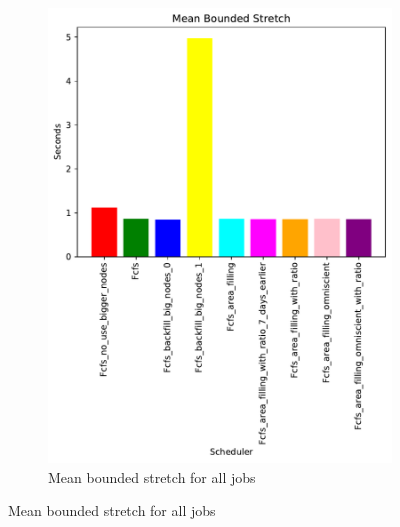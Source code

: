 \documentclass[a4paper]{article}
\begin{document}
\begin{figure}[H]\centering
\begin{subfigure}[b]{0.4\linewidth}\centering\includegraphics[width=0.95\linewidth]{MBSS/plot/Size_Constraint_2022-01-17->2022-01-17_V10000_Mean_Stretch_With_a_Minimum_450_128_32_256_4_1024.pdf}\caption{Mean bounded stretch for all jobs}\label{45}\end{subfigure}

\end{figure}
\end{document}
